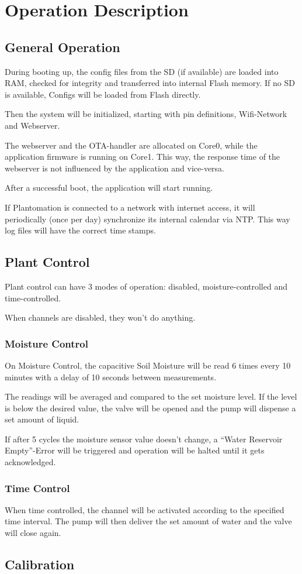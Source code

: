 \chapter{Operation Description}
\section{General Operation}
During booting up, the config files from the SD (if available) are loaded into RAM, checked for integrity and transferred into internal Flash memory. If no SD is available, Configs will be loaded from Flash directly. 

Then the system will be initialized, starting with pin definitions, Wifi-Network and Webserver. 

The webserver and the OTA-handler are allocated on Core0, while the application firmware is running on Core1. This way, the response time of the webserver is not influenced by the application and vice-versa. 

After a successful boot, the application will start running.

If Plantomation is connected to a network with internet access, it will periodically (once per day) synchronize its internal calendar via NTP. This way log files will have the correct time stamps. 

\section{Plant Control}
Plant control can have 3 modes of operation: disabled, moisture-controlled and time-controlled.

When channels are disabled, they won't do anything. 

\subsection{Moisture Control}
On Moisture Control, the capacitive Soil Moisture will be read 6 times every 10 minutes with a delay of 10 seconds between measurements. 

The readings will be averaged and compared to the set moisture level. If the level is below the desired value, the valve will be opened and the pump will dispense a set amount of liquid. 

If after 5 cycles the moisture sensor value doesn't change, a ``Water Reservoir Empty''-Error will be triggered and operation will be halted until it gets acknowledged. 

\subsection{Time Control}
When time controlled, the channel will be activated according to the specified time interval. The pump will then deliver the set amount of water and the valve will close again. 

\section{Calibration}